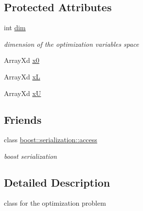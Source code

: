 \subsection*{Protected Attributes}
\begin{DoxyCompactItemize}
\item 
int \hyperlink{class_go_s_u_m_1_1_c_optimization_problem_aa70d039a76ff7035c4a3ee2fd74ffbd8}{dim}
\begin{DoxyCompactList}\small\item\em dimension of the optimization variables space \end{DoxyCompactList}\item 
Array\-Xd \hyperlink{class_go_s_u_m_1_1_c_optimization_problem_ab2c71b74e7dc5bec96506cc8cce956c7}{x0}
\item 
Array\-Xd \hyperlink{class_go_s_u_m_1_1_c_optimization_problem_a99796cf462106bbaf77978c758870e50}{x\-L}
\item 
Array\-Xd \hyperlink{class_go_s_u_m_1_1_c_optimization_problem_a5e0cdecb37f4aace6f10944e2fa9ab3f}{x\-U}
\end{DoxyCompactItemize}
\subsection*{Friends}
\begin{DoxyCompactItemize}
\item 
class \hyperlink{class_go_s_u_m_1_1_c_optimization_problem_ac98d07dd8f7b70e16ccb9a01abf56b9c}{boost\-::serialization\-::access}
\begin{DoxyCompactList}\small\item\em boost serialization \end{DoxyCompactList}\end{DoxyCompactItemize}


\subsection{Detailed Description}
class for the optimization problem 

